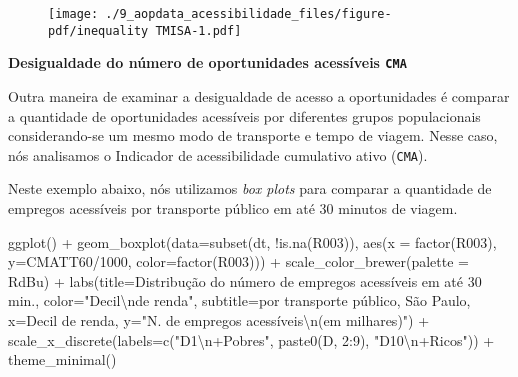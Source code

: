 \documentclass[
  letterpaper,
  DIV=11,
  numbers=noendperiod]{scrreprt}
\newenvironment{Shaded}{\begin{snugshade}}{\end{snugshade}}
\newcommand{\AttributeTok}[1]{\textcolor[rgb]{0.40,0.45,0.13}{#1}}
\newcommand{\DecValTok}[1]{\textcolor[rgb]{0.68,0.00,0.00}{#1}}
\newcommand{\FunctionTok}[1]{\textcolor[rgb]{0.28,0.35,0.67}{#1}}
\newcommand{\NormalTok}[1]{\textcolor[rgb]{0.00,0.23,0.31}{#1}}
\newcommand{\SpecialCharTok}[1]{\textcolor[rgb]{0.37,0.37,0.37}{#1}}
\newcommand{\StringTok}[1]{\textcolor[rgb]{0.13,0.47,0.30}{#1}}
\begin{document}
\begin{figure}[H]

{\centering \texttt{[image: ./9\_aopdata\_acessibilidade\_files/figure-pdf/inequality TMISA-1.pdf]}

}

\end{figure}

\textbf{Desigualdade do número de oportunidades acessíveis \texttt{CMA}}

Outra maneira de examinar a desigualdade de acesso a oportunidades é
comparar a quantidade de oportunidades acessíveis por diferentes grupos
populacionais considerando-se um mesmo modo de transporte e tempo de
viagem. Nesse caso, nós analisamos o Indicador de acessibilidade
cumulativo ativo (\texttt{CMA}).

Neste exemplo abaixo, nós utilizamos \emph{box plots} para comparar a
quantidade de empregos acessíveis por transporte público em até 30
minutos de viagem.

\begin{Shaded}
\begin{Highlighting}[]
\FunctionTok{ggplot}\NormalTok{() }\SpecialCharTok{+}
  \FunctionTok{geom\_boxplot}\NormalTok{(}\AttributeTok{data=}\FunctionTok{subset}\NormalTok{(dt, }\SpecialCharTok{!}\FunctionTok{is.na}\NormalTok{(R003)),}
               \FunctionTok{aes}\NormalTok{(}\AttributeTok{x =} \FunctionTok{factor}\NormalTok{(R003), }\AttributeTok{y=}\NormalTok{CMATT60}\SpecialCharTok{/}\DecValTok{1000}\NormalTok{, }\AttributeTok{color=}\FunctionTok{factor}\NormalTok{(R003))) }\SpecialCharTok{+}
  \FunctionTok{scale\_color\_brewer}\NormalTok{(}\AttributeTok{palette =} \StringTok{\textquotesingle{}RdBu\textquotesingle{}}\NormalTok{) }\SpecialCharTok{+}
  \FunctionTok{labs}\NormalTok{(}\AttributeTok{title=}\StringTok{\textquotesingle{}Distribução do número de empregos acessíveis em até 30 min.\textquotesingle{}}\NormalTok{, }\AttributeTok{color=}\StringTok{"Decil}\SpecialCharTok{\textbackslash{}n}\StringTok{de renda"}\NormalTok{,}
       \AttributeTok{subtitle=}\StringTok{\textquotesingle{}por transporte público, São Paulo\textquotesingle{}}\NormalTok{,}
       \AttributeTok{x=}\StringTok{\textquotesingle{}Decil de renda\textquotesingle{}}\NormalTok{, }\AttributeTok{y=}\StringTok{"N. de empregos acessíveis}\SpecialCharTok{\textbackslash{}n}\StringTok{(em milhares)"}\NormalTok{) }\SpecialCharTok{+}
  \FunctionTok{scale\_x\_discrete}\NormalTok{(}\AttributeTok{labels=}\FunctionTok{c}\NormalTok{(}\StringTok{"D1}\SpecialCharTok{\textbackslash{}n}\StringTok{+Pobres"}\NormalTok{, }\FunctionTok{paste0}\NormalTok{(}\StringTok{\textquotesingle{}D\textquotesingle{}}\NormalTok{, }\DecValTok{2}\SpecialCharTok{:}\DecValTok{9}\NormalTok{), }\StringTok{"D10}\SpecialCharTok{\textbackslash{}n}\StringTok{+Ricos"}\NormalTok{)) }\SpecialCharTok{+}
  \FunctionTok{theme\_minimal}\NormalTok{()}
\end{Highlighting}
\end{Shaded}
\end{document}
